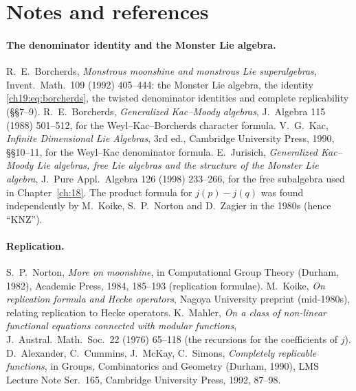 \section{Notes and references}\label{ch19:sec:notes}

\paragraph{The denominator identity and the Monster Lie algebra.}  R.~E.~Borcherds, \emph{Monstrous moonshine and monstrous Lie
superalgebras}, Invent.\ Math.\ 109 (1992) 405--444: the Monster Lie algebra, the identity \eqref{ch19:eq:borcherds}, the twisted
denominator identities and complete replicability (\S\S7--9).  R.~E.~Borcherds, \emph{Generalized Kac--Moody algebras}, J.\ Algebra 115 (1988)
501--512, for the Weyl--Kac--Borcherds character formula.  V.~G.~Kac, \emph{Infinite Dimensional Lie Algebras}, 3rd ed., Cambridge University
Press, 1990, \S\S10--11, for the Weyl--Kac denominator formula.  E.~Jurisich, \emph{Generalized Kac--Moody Lie algebras, free Lie algebras and the
structure of the Monster Lie algebra}, J.\ Pure Appl.\ Algebra 126 (1998) 233--266, for the free subalgebra used in Chapter~\ref{ch:18}.  The
product formula for $j(p)-j(q)$ was found independently by M.~Koike, S.~P.~Norton and D.~Zagier in the 1980s (hence ``KNZ'').

\paragraph{Replication.}  S.~P.~Norton, \emph{More on moonshine}, in Computational Group Theory (Durham, 1982), Academic Press, 1984,
185--193 (replication formulae).  M.~Koike, \emph{On replication formula and Hecke operators}, Nagoya University preprint (mid-1980s),
relating replication to Hecke operators.  K.~Mahler, \emph{On a class of non-linear functional equations connected with modular functions},
J.\ Austral.\ Math.\ Soc.\ 22 (1976) 65--118 (the recursions for the coefficients of $j$).  D.~Alexander, C.~Cummins, J.~McKay, C.~Simons,
\emph{Completely replicable functions}, in Groups, Combinatorics and Geometry (Durham, 1990), LMS Lecture Note Ser.\ 165, Cambridge University
Press, 1992, 87--98.

